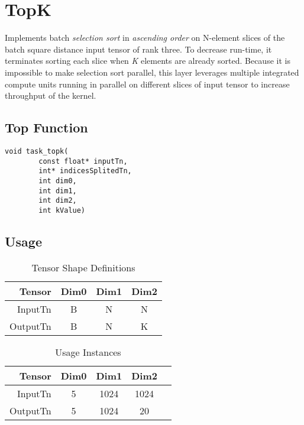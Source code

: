 \pagebreak












\section{TopK}
Implements batch \emph{selection sort} in \emph{ascending order} on N-element slices of the batch square distance input tensor of rank three. To decrease run-time, it terminates sorting each slice when \emph{K} elements are already sorted. Because it is impossible to make selection sort parallel, this layer leverages multiple integrated compute units running in parallel on different slices of input tensor to increase throughput of the kernel. 

\subsection{Top Function}
\begin{lstlisting}
void task_topk(
		const float* inputTn,
		int* indicesSplitedTn,
		int dim0,
		int dim1,
		int dim2,
		int kValue)
\end{lstlisting}

\subsection{Usage}
\begin{table}[htbp] %
\caption{Tensor Shape Definitions}
\label{tab:shapes_concat}
	\begin{center}
		\begin{tabular}{|r|c|c|c|} 
		\hline	
		Tensor & Dim0 & Dim1 & Dim2 \\ 
		\hline	
		InputTn &
			B &
			N &
			N\\ 
		\hline	
		OutputTn &
			B & 
			N & 
			K \\
		\hline
		\end{tabular}
	\end{center}
\end{table}

\begin{table}[htbp] %
\caption{Usage Instances}
\label{tab:shapes_transpose}
	\begin{center}
		\begin{tabular}{|r|c|c|c|c|} 
		\hline	
		Tensor & Dim0 & Dim1 & Dim2 \\ 
		\hline	
		InputTn &
			5 &
			1024 &
			1024 \\ 
		\hline
		OutputTn &
			5 &
			1024 & 
			20\\ 
		\hline
		\end{tabular}
	\end{center}
\end{table}


